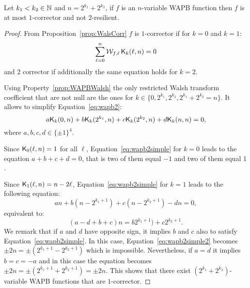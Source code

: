 \documentclass[11pt]{llncs}
\begin{document}
\begin{proposition}\label{prop:WAPB2}
	Let $k_1<k_2\in \mathbb{N}$ and $n=2^{k_1}+2^{k_2}$, if $f$ is an $n$-variable WAPB function then $f$ is at most $1$-corrector and not $2$-resilient.
\end{proposition}
\begin{proof}
	From Proposition~\ref{prop:WalsCorr} $f$ is $1$-corrector if for $k=0$ and $k=1$:
	\begin{equation}\label{eq:wapb2}
	\sum_{\ell=0}^{n} \mathcal{W}_{f,\ell} \, \mathsf{K}_{k}(\ell,n)=0
	\end{equation}
	and $2$ corrector if additionally the same equation holds for $k=2$.
	
Using Property~\ref{prop:WAPBWalsh} the only restricted Walsh transform coefficient that are not null are the ones for $k\in\{0,2^{k_1},2^{k_2},2^{k_1}+2^{k_2}=n\}$. It allows to simplify Equation~\ref{eq:wapb2}:
	\begin{equation}\label{eq:wapb2simple}
a \mathsf{K}_{k}(0,n) + b \mathsf{K}_{k}(2^{k_1},n) + c \mathsf{K}_{k}(2^{k_2},n) + d \mathsf{K}_{k}(n,n)=0,
\end{equation}
where $a,b,c,d \in \{\pm 1\}^4$.

Since $ \mathsf{K}_{0}(\ell,n)=1$ for all $\ell$, Equation~\ref{eq:wapb2simple} for $k=0$ leads to the equation $a+b+c+d=0$, that is two of them equal $-1$ and two of them equal $1$. 

Since $ \mathsf{K}_{1}(\ell,n)=n-2\ell$, Equation~\ref{eq:wapb2simple} for $k=1$ leads to the following equation:
\begin{equation*}
a n+b (n-2^{k_1+1}) +c (n-2^{k_2+1}) -d n=0,
\end{equation*}
equivalent to:
\begin{equation}\label{eq:wapb2simple2}
 (a-d+b+c) n= b 2^{k_1+1}) +c 2^{k_2+1}. 
\end{equation}
We remark that if $a$ and $d$ have opposite sign, it implies $b$ and $c$ also to satisfy Equation~\ref{eq:wapb2simple}. 
In this case, Equation~\ref{eq:wapb2simple2} becomes $\pm2n= \pm (2^{k_1+1} - 2^{k_2+1})$ which is impossible. 
Nevertheless, if $a=d$ it implies $b=c=-a$ and in this case the equation becomes $\pm 2n = \pm (2^{k_1+1} + 2^{k_2+1})=\pm 2n$. 
This shows that there exist $(2^{k_1}+2^{k_2})$-variable WAPB functions that are $1$-corrector.



\end{proof}
\end{document}
